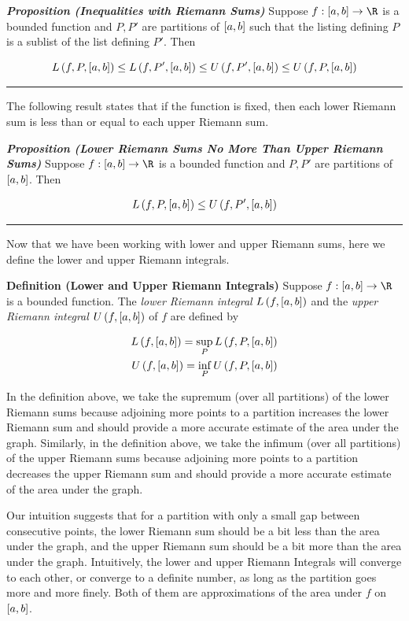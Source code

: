 \documentclass[
]{article}
\begin{document}
\emph{\textbf{Proposition (Inequalities with Riemann Sums)}} Suppose
\(f:\br{a,b}\to \R\) is a bounded function and \(P,P'\) are partitions
of \(\left[a,b\right]\) such that the listing defining \(P\) is a sublist of the
list defining \(P'\). Then

\[L\left(f,P,\left[a,b\right]\right)\le L\left(f,P',\left[a,b\right]\right)\le U\left(f,P',\left[a,b\right]\right)\le U\left(f,P,\left[a,b\right]\right)\]

\begin{center}\rule{0.5\linewidth}{0.5pt}\end{center}

The following result states that if the function is fixed, then each
lower Riemann sum is less than or equal to each upper Riemann sum.

\emph{\textbf{Proposition (Lower Riemann Sums No More Than Upper Riemann
Sums)}} Suppose \(f:\br{a,b}\to \R\) is a bounded function and \(P,P'\)
are partitions of \(\left[a,b\right]\). Then

\[L\left(f,P,\left[a,b\right]\right)\le U\left(f,P',\left[a,b\right]\right)\]

\begin{center}\rule{0.5\linewidth}{0.5pt}\end{center}

Now that we have been working with lower and upper Riemann sums, here we
define the lower and upper Riemann integrals.

\textbf{Definition (Lower and Upper Riemann Integrals)} Suppose
\(f:\br{a,b}\to \R\) is a bounded function. The \emph{lower Riemann
integral} \(L\left(f,\left[a,b\right]\right)\) and the \emph{upper Riemann integral}
\(U\left(f,\left[a,b\right]\right)\) of \(f\) are defined by

\[\begin{aligned}
L\left(f,\left[a,b\right]\right) = \sup_P L\left(f,P,\left[a,b\right]\right)\\
U\left(f,\left[a,b\right]\right) = \inf_P U\left(f,P,\left[a,b\right]\right)
\end{aligned}\]

In the definition above, we take the supremum (over all partitions) of
the lower Riemann sums because adjoining more points to a partition
increases the lower Riemann sum and should provide a more accurate
estimate of the area under the graph. Similarly, in the definition
above, we take the infimum (over all partitions) of the upper Riemann
sums because adjoining more points to a partition decreases the upper
Riemann sum and should provide a more accurate estimate of the area
under the graph.

Our intuition suggests that for a partition with only a small gap
between consecutive points, the lower Riemann sum should be a bit less
than the area under the graph, and the upper Riemann sum should be a bit
more than the area under the graph. Intuitively, the lower and upper
Riemann Integrals will converge to each other, or converge to a definite
number, as long as the partition goes more and more finely. Both of them
are approximations of the area under \(f\) on \(\left[a,b\right]\).
\end{document}
